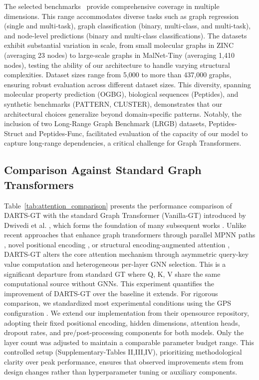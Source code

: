 \documentclass[lettersize,journal]{IEEEtran}
\begin{document}
The selected benchmarks~\cite{rampa_recipe_nodate} provide comprehensive coverage in multiple dimensions. This range accommodates diverse tasks such as graph regression (single and multi-task), graph classification (binary, multi-class, and multi-task), and node-level predictions (binary and multi-class classifications). The datasets exhibit substantial variation in scale, from small molecular graphs in ZINC (averaging 23 nodes) to large-scale graphs in MalNet-Tiny (averaging 1,410 nodes), testing the ability of our architecture to handle varying structural complexities. Dataset sizes range from 5,000 to more than 437,000 graphs, ensuring robust evaluation across different dataset sizes. This diversity, spanning molecular property prediction (OGBG), biological sequences (Peptides), and synthetic benchmarks (PATTERN, CLUSTER), demonstrates that our architectural choices generalize beyond domain-specific patterns. Notably, the inclusion of two Long-Range Graph Benchmark (LRGB) datasets, Peptides-Struct and Peptides-Func, facilitated evaluation of the capacity of our model to capture long-range dependencies, a critical challenge for Graph Transformers.

\subsection{Comparison Against Standard Graph Transformers}

Table~\ref{tab:attention_comparison} presents the performance comparison of DARTS-GT with the standard Graph Transformer (Vanilla-GT) introduced by Dwivedi et al. \cite{dwivedi_generalization_2021}, which forms the foundation of many subsequent works \cite{song_towards_2025}. Unlike recent approaches that enhance graph transformers through parallel MPNN paths \cite{rampa_recipe_nodate}, novel positional encoding \cite{kreuzer_rethinking_2021}, or structural encoding-augmented attention \cite{ying_transformers_2021}, DARTS-GT alters the core attention mechanism through asymmetric query-key value computation and heterogeneous per-layer GNN selection. This is a significant departure from standard GT where Q, K, V share the same computational source without GNNs. This experiment quantifies the improvement of DARTS-GT  over the baseline it extends.
For rigorous comparison, we standardized most experimental conditions using the GPS configuration \cite{rampa_recipe_nodate}. We extend our implementation from their opensource repository, adopting their fixed positional encoding, hidden dimensions, attention heads, dropout rates, and pre/post-processing components for both models. Only the layer count was adjusted to maintain a comparable parameter budget range. This controlled setup (Supplementary-Tables II,III,IV), prioritizing methodological clarity over peak performance, ensures that observed improvements stem from design changes rather than hyperparameter tuning or auxiliary components.
\end{document}
